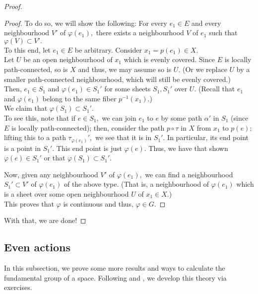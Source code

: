 \documentclass[12pt]{article}
\newenvironment{blockquote}
{\begin{mdframed}[skipabove=0pt, skipbelow=0pt, innertopmargin=4pt, innerbottommargin=4pt, bottomline=false,topline=false,rightline=false, linewidth=2pt]}
{\end{mdframed}}
\begin{document}
\begin{proof}
\begin{blockquote}
\begin{proof}
			To do so, we will show the following: For every $e_1 \in E$ and every neighbourhood $V'$ of $\varphi(e_1),$ there exists a neighbourhood $V$ of $e_1$ such that $\varphi(V) \subset V'.$\\
			To this end, let $e_1 \in E$ be arbitrary. Consider $x_1 = p(e_1) \in X.$\\
			Let $U$ be an open neighbourhood of $x_1$ which is evenly covered. Since $E$ is locally path-connected, so is $X$ and thus, we may assume so is $U.$ (Or we replace $U$ by a smaller path-connected neighbourhood, which will still be evenly covered.)\\
			Then, $e_1 \in S_1$ and $\varphi(e_1) \in S_1'$ for some sheets $S_1, S_1'$ over $U.$ (Recall that $e_1$ and $\varphi(e_1)$ belong to the same fiber $p^{-1}(x_1).$) \\
			We claim that $\varphi(S_1) \subset S_1'.$ \\
			To see this, note that if $e \in S_1,$ we can join $e_1$ to $e$ by some path $\alpha'$ in $S_1$ (since $E$ is locally path-connected); then, consider the path $p\circ \tau$ in $X$ from $x_1$ to $p(e);$ lifting this to a path $\tau_{\varphi(e_1)}',$ we see that it is in $S_1'.$ In particular, its end point is a point in $S_1'.$ This end point is just $\varphi(e).$ Thus, we have that shown $\varphi(e) \in S_1'$ or that $\varphi(S_1) \subset S_1'.$

			Now, given any neighbourhood $V'$ of $\varphi(e_1),$ we can find a neighbourhood $S_1' \subset V'$ of $\varphi(e_1)$ of the above type. (That is, a neighbourhood of $\varphi(e_1)$ which is a sheet over some open neighbourhood $U$ of $x_1 \in X.$)\\
			This proves that $\varphi$ is continuous and thus, $\varphi \in G.$
		\end{proof}
	\end{blockquote}
	With that, we are done!
\end{proof}
\subsection{Even actions}
In this subsection, we prove some more results and ways to calculate the fundamental group of a space. Following \cite{green} and \cite{fult}, we develop this theory via exercises.
\end{document}
